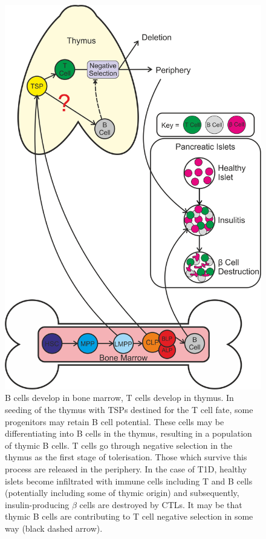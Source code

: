 \begin{figure}
\includegraphics[width=\textwidth]{Figures/Introductorydiagram.png}
\caption[Diagrammatical overview of project]{B cells develop in bone marrow, T cells develop in thymus. 
In seeding of the thymus with TSPs destined for the T cell fate, some progenitors may retain B cell potential.
These cells may be differentiating into B cells in the thymus, resulting in a population of thymic B cells.
T cells go through negative selection in the thymus as the first stage of tolerisation. 
Those which survive this process are released in the periphery.
In the case of T1D, healthy islets become infiltrated with immune cells including T and B cells (potentially including some of thymic origin) and subsequently, insulin-producing $\beta$ cells are destroyed by CTLs.
It may be that thymic B cells are contributing to T cell negative selection in some way (black dashed arrow).}
\label{fig:summarydiagram}
\end{figure}




































